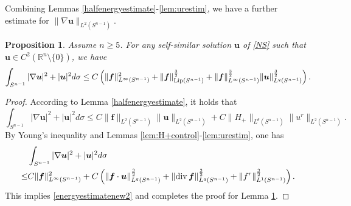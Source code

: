 \documentclass[12pt]{amsart}
\newtheorem{pro}[theorem]{Proposition}
\renewcommand{\div}{{\rm div \thinspace }}
\newcommand{\Bu}{{\boldsymbol{u}}}
\newcommand{\Bf}{{\boldsymbol{f}}}
\begin{document}
	{
		Combining Lemmas \ref{halfenergyestimate}-\ref{lem:urestim}, we have a further estimate for $\|\nabla \Bu\|_{L^2(S^{n-1})}$. 
		\begin{pro}\label{lemmaenergyestimatenleq10}
			Assume $n\geq 5$. For any self-similar solution $\Bu$ of \eqref{NS} such that $\Bu\in C^2(\mathbb{R}^n\setminus \{0\})$, we have 
			\begin{equation}\label{energyestimatenew2}
				\int_{S^{n-1}}|\nabla \Bu|^2 + | \Bu|^2d\sigma \leq C \left( \|\Bf\|_{L^\infty(S^{n-1})}^2 + \|\Bf\|_{\textnormal{Lip}(S^{n-1})}^\frac32 + \|\Bf\|_{L^\infty(S^{n-1})}^{\frac32}\|\Bu\|_{L^q(S^{n-1})}^{\frac32} \right). 
			\end{equation}
		\end{pro}
		
		\begin{proof}
			According to Lemma \ref{halfenergyestimate}, it holds that
			\begin{equation*}
				\int_{S^{n-1}}|\nabla \Bu|^2 + |\Bu|^2 d\sigma  
				\leq C \|\Bf\|_{L^2(S^{n-1})}\|\Bu\|_{L^2(S^{n-1})} + C \|H_{+}\|_{L^\theta(S^{n-1})}\|u^r\|_{L^2(S^{n-1})}.
			\end{equation*}
			By Young's inequality and Lemmas \ref{lem:H+control}-\ref{lem:urestim}, one has
			\begin{equation*}
				\begin{aligned}    
					& \int_{S^{n-1}}|\nabla \Bu|^2 + |\Bu|^2  d\sigma \\
					\leq &  C \|\Bf\|_{L^\infty(S^{n-1})}^2  + C   \left( \|\Bf\cdot \Bu\|_{L^q(S^{n-1})}^{\frac32} + \|\div \Bf\|_{L^q(S^{n-1})}^{\frac32}   + \|f^r\|_{L^1(S^{n-1})}^\frac32 \right).
				\end{aligned}  
			\end{equation*}
			This implies \eqref{energyestimatenew2} and completes the proof for Lemma \ref{lemmaenergyestimatenleq10}.
		\end{proof}
	} 
	
	
	
	
	
\end{document}
